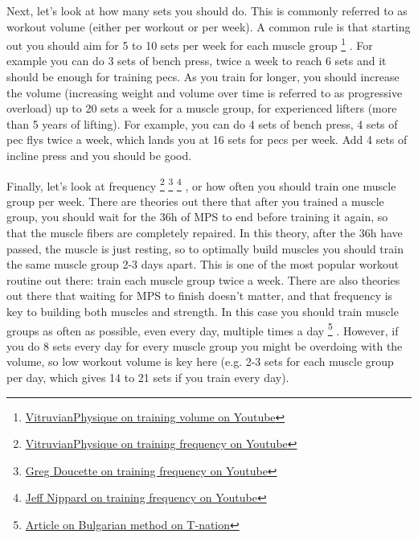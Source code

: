 \documentclass[openany, 12pt]{book}
\begin{document}
        Next, let's look at how many sets you should do. This is commonly referred to as workout volume (either per workout or per week). A common rule is that starting out you should aim for
        5 to 10 sets per week for each muscle group
        \footnote{\href{https://www.youtube.com/watch?v=HTJTpVwg2Oo}{VitruvianPhysique on training volume on Youtube}}
        . For example you can do 3 sets of bench press, twice a week to reach 6 sets and it should be enough for training pecs. As you train for longer, you
        should increase the volume (increasing weight and volume over time is referred to as progressive overload) up to 20 sets a week for a muscle group, for experienced lifters (more than 5 years of
        lifting). For example, you can do 4 sets of bench press, 4 sets of pec flys twice a week, which lands you at 16 sets for pecs per week. Add 4 sets of incline press and you should be good.

        Finally, let's look at frequency
        \footnote{\href{https://www.youtube.com/watch?v=5NqtfvR7v4A}{VitruvianPhysique on training frequency on Youtube}}
        \footnote{\href{https://www.youtube.com/watch?v=PrUgmKRbOxE}{Greg Doucette on training frequency on Youtube}}
        \footnote{\href{https://www.youtube.com/watch?v=eTxO5ZMxcsc}{Jeff Nippard on training frequency on Youtube}}
        , or how often you should train one muscle group per week. There are theories out there that after you trained a muscle group, you should wait for the 36h of
        MPS to end before training it again, so that the muscle fibers are completely repaired. In this theory, after the 36h have passed, the muscle is just resting, so to optimally
        build muscles you should train the same muscle group 2-3 days apart. This is one of the most popular workout routine out there: train each muscle group twice a week.
        There are also theories out there that waiting for MPS to finish doesn't matter, and that frequency is key to building both muscles and strength. In this case you should train muscle groups as
        often as possible, even every day, multiple times a day
        \footnote{\href{https://www.t-nation.com/workouts/bulgarian-training-simplified/}{Article on Bulgarian method on T-nation}}
        . However, if you do 8 sets every day for every muscle group you might be overdoing with the volume, so low workout
        volume is key here (e.g. 2-3 sets for each muscle group per day, which gives 14 to 21 sets if you train every day).
\end{document}
